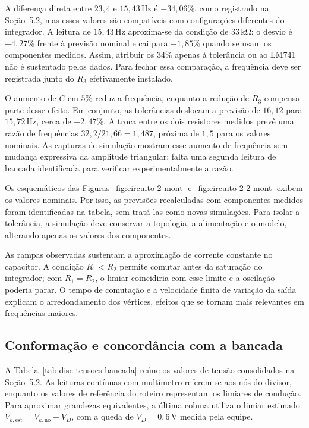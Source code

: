 \documentclass[11pt,a4paper]{article}
\begin{document}
\begin{samepage}
A diferença direta entre $23{,}4$ e $15{,}43\,\mathrm{Hz}$ é
$-34{,}06\%$, como registrado na Seção~5.2, mas esses valores são
compatíveis com configurações diferentes do integrador. A leitura de
$15{,}43\,\mathrm{Hz}$ aproxima-se da condição de $33\,\mathrm{k\Omega}$:
o desvio é $-4{,}27\%$ frente à previsão nominal e cai para $-1{,}85\%$
quando se usam os componentes medidos. Assim, atribuir os $34\%$ apenas
à tolerância ou ao LM741 não é sustentado pelos dados. Para fechar essa
comparação, a frequência deve ser registrada junto do $R_3$ efetivamente
instalado.
\end{samepage}

O aumento de $C$ em $5\%$ reduz a frequência, enquanto a redução de $R_3$
compensa parte desse efeito. Em conjunto, as tolerâncias deslocam a
previsão de $16{,}12$ para $15{,}72\,\mathrm{Hz}$, cerca de $-2{,}47\%$.
A troca entre os dois resistores medidos prevê uma razão de frequências
$32{,}2/21{,}66=1{,}487$, próxima de $1{,}5$ para os valores nominais.
As capturas de simulação mostram esse aumento de frequência sem mudança
expressiva da amplitude triangular; falta uma segunda leitura de bancada
identificada para verificar experimentalmente a razão.

Os esquemáticos das Figuras~\ref{fig:circuito-2-mont}
e~\ref{fig:circuito-2-2-mont} exibem os valores nominais. Por isso,
as previsões recalculadas com componentes medidos foram identificadas
na tabela, sem tratá-las como novas simulações. Para isolar a tolerância,
a simulação deve conservar a topologia, a alimentação e o modelo,
alterando apenas os valores dos componentes.

As rampas observadas sustentam a aproximação de corrente constante no
capacitor. A condição $R_1<R_2$ permite comutar antes da saturação do
integrador; com $R_1=R_2$, o limiar coincidiria com esse limite e a
oscilação poderia parar. O tempo de comutação e a velocidade finita
de variação da saída explicam o arredondamento dos vértices, efeitos
que se tornam mais relevantes em frequências maiores.

\subsection{Conformação e concordância com a bancada}

A Tabela~\ref{tab:disc-tensoes-bancada} reúne os valores de tensão
consolidados na Seção~5.2. As leituras contínuas com multímetro referem-se
aos nós do divisor, enquanto os valores de referência do roteiro
representam os limiares de condução. Para aproximar grandezas equivalentes,
a última coluna utiliza o limiar estimado
$V_{k,\mathrm{est}}=V_{k,\mathrm{nó}}+V_D$, com a queda de
$V_D=0{,}6\,\mathrm{V}$ medida pela equipe.
\end{document}

